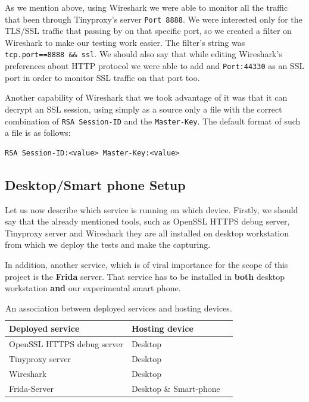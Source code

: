 \documentclass[12pt, a4paper]{report}
\begin{document}
As we mention above, using Wireshark we were able to monitor all the traffic  that been through Tinyproxy's server \texttt{Port 8888}. We were interested only for the TLS/SSL traffic that passing by on that specific port, so we created a filter on Wireshark to make our testing work easier. The filter's string was \texttt{tcp.port==8888 \&\& ssl}. We should also say that while editing Wireshark's preferences about HTTP protocol we were able to add and \texttt{Port:44330} as an SSL port in order to monitor SSL traffic on that port too.

Another capability of Wireshark that we took advantage of it was that it can decrypt an SSL session, using simply as a source only a file with the correct combination of \texttt{RSA Session-ID} and the \texttt{Master-Key}. The default format of such a file is as follows:
\begin{lstlisting}[frame=single, breaklines=true]
RSA Session-ID:<value> Master-Key:<value>		
\end{lstlisting}

\subsection{Desktop/Smart phone Setup}

Let us now describe which service is running on which device. Firstly, we should say that the already mentioned tools, such as OpenSSL HTTPS debug server, Tinyproxy server and Wireshark they are all installed on desktop workstation from which we deploy the tests and make the capturing.

In addition, another service, which is of viral importance for the scope of this project is the \textbf{Frida} server. That service has to be installed in \textbf{both} desktop workstation \textbf{and} our experimental smart phone.

\begin{table}[h]
\centering
    \begin{tabular}{ | l | l | p{5cm} |}
    \hline
    \textbf{Deployed service} & \textbf{Hosting device} \\ \hline
    OpenSSL HTTPS debug server & Desktop \\ \hline 
    Tinyproxy server & Desktop \\ \hline
    Wireshark & Desktop \\ \hline
    Frida-Server & Desktop \& Smart-phone \\ \hline
    \end{tabular}
    \caption{An association between deployed services and hosting devices.}
\end{table}
\end{document}
